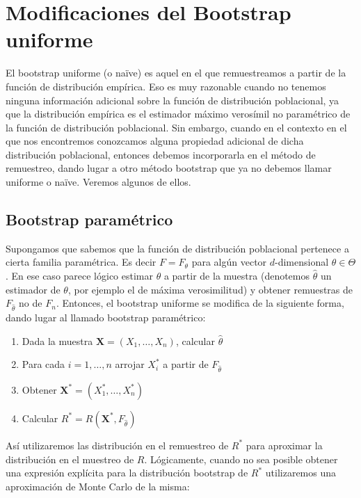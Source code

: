 \documentclass[
]{book}
\theoremstyle{break}
\theoremstyle{definition}
\theoremstyle{definition}
\theoremstyle{definition}
\theoremstyle{definition}
\theoremstyle{remark}
\begin{document}
\hypertarget{modunif}{%
\chapter{Modificaciones del Bootstrap uniforme}\label{modunif}}

El bootstrap uniforme (o naïve) es aquel en el que remuestreamos a
partir de la función de distribución empírica. Eso es muy razonable
cuando no tenemos ninguna información adicional sobre la función de
distribución poblacional, ya que la distribución empírica es el
estimador máximo verosímil no paramétrico de la función de distribución
poblacional. Sin embargo, cuando en el contexto en el que nos
encontremos conozcamos alguna propiedad adicional de dicha distribución
poblacional, entonces debemos incorporarla en el método de remuestreo,
dando lugar a otro método bootstrap que ya no debemos llamar uniforme o
naïve. Veremos algunos de ellos.

\hypertarget{modunif-boot-par}{%
\section{Bootstrap paramétrico}\label{modunif-boot-par}}

Supongamos que sabemos que la función de distribución poblacional
pertenece a cierta familia paramétrica. Es decir \(F=F_{\theta }\) para
algún vector \(d\)-dimensional \(\theta \in \Theta\). En ese caso parece
lógico estimar \(\theta\) a partir de la muestra (denotemos
\(\hat{\theta}\) un estimador de \(\theta\), por ejemplo el de máxima
verosimilitud) y obtener remuestras de \(F_{\hat{\theta}}\) no de \(F_n\).
Entonces, el bootstrap uniforme se modifica de la siguiente forma, dando
lugar al llamado bootstrap paramétrico:

\begin{enumerate}
\def\labelenumi{\arabic{enumi}.}
\item
  Dada la muestra
  \(\mathbf{X}=\left( X_1,\ldots ,X_n \right)\), calcular
  \(\hat{\theta}\)
\item
  Para cada \(i=1,\ldots ,n\) arrojar \(X_i^{\ast}\) a partir de
  \(F_{\hat{\theta}}\)
\item
  Obtener \(\mathbf{X}^{\ast}=\left( X_1^{\ast},\ldots ,X_n^{\ast} \right)\)
\item
  Calcular \(R^{\ast}=R\left( \mathbf{X}^{\ast},F_{\hat{\theta}} \right)\)
\end{enumerate}

Así utilizaremos las distribución en el remuestreo de \(R^{\ast}\) para
aproximar la distribución en el muestreo de \(R\). Lógicamente, cuando no
sea posible obtener una expresión explícita para la distribución
bootstrap de \(R^{\ast}\) utilizaremos una aproximación de Monte Carlo de
la misma:
\end{document}
